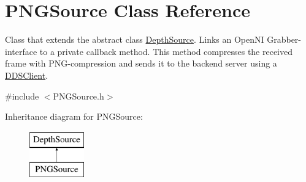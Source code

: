 \hypertarget{class_p_n_g_source}{\section{P\+N\+G\+Source Class Reference}
\label{class_p_n_g_source}
}


Class that extends the abstract class \hyperlink{class_depth_source}{Depth\+Source}. Links an Open\+N\+I Grabber-\/interface to a private callback method. This method compresses the received frame with P\+N\+G-\/compression and sends it to the backend server using a \hyperlink{class_d_d_s_client}{D\+D\+S\+Client}.  




{\ttfamily \#include $<$P\+N\+G\+Source.\+h$>$}

Inheritance diagram for P\+N\+G\+Source\+:\begin{figure}[H]
\begin{center}
\leavevmode
\includegraphics[height=2.000000cm]{class_p_n_g_source}
\end{center}
\end{figure}
